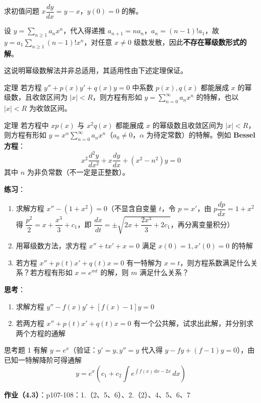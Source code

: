 \begin{example}
求初值问题 $x\dfrac{dy}{dx} = y - x$，$y(0) = 0$ 的解。
\end{example}

\begin{solution}
设 $y = \sum_{n\ge 1} a_n x^n$，代入得递推 $a_{n+1} = na_n$，$a_n = (n-1)!a_1$，故 $y = a_1\sum_{n\ge1}(n-1)!x^n$，对任意 $x \neq 0$ 级数发散，因此\textbf{不存在幂级数形式的解}。
\end{solution}

\begin{remark}
这说明幂级数解法并非总适用，其适用性由下述定理保证。
\end{remark}

\begin{myTheorem}{定理}
若方程 $y'' + p(x)y' + q(x)y = 0$ 中系数 $p(x), q(x)$ 都能展成 $x$ 的幂级数，且收敛区间为 $|x| < R$，则方程有形如 $y = \sum_{n=0}^{\infty} a_n x^n$ 的特解，也以 $|x| < R$ 为收敛区间。
\end{myTheorem}

\begin{myTheorem}{定理}
若方程中 $xp(x)$ 与 $x^2q(x)$ 都能展成 $x$ 的幂级数且收敛区间为 $|x| < R$，则方程有形如 $y = x^\alpha\sum_{n=0}^{\infty} a_n x^n$（$a_0 \neq 0$，$\alpha$ 为待定常数）的特解。例如 \textbf{Bessel 方程}：
$$x^2\frac{d^2y}{dx^2} + x\frac{dy}{dx} + (x^2 - n^2)y = 0$$
其中 $n$ 为非负常数（不一定是正整数）。
\end{myTheorem}

\textbf{练习}：
\begin{enumerate}
    \item 求解方程 $x'' - (1 + x^2) = 0$（不显含自变量 $t$，令 $p = x'$，由 $p\dfrac{dp}{dx} = 1+x^2$ 得 $\dfrac{p^2}{2} = x + \dfrac{x^3}{3} + c_1$，即 $\dfrac{dx}{dt} = \pm\sqrt{2x + \dfrac{2x^3}{3} + 2c_1}$，再分离变量积分）
    \item 用幂级数方法，求方程 $x'' + tx' + x = 0$ 满足 $x(0) = 1, x'(0) = 0$ 的特解
    \item 若方程 $x'' + p(t)x' + q(t)x = 0$ 有一特解为 $x = t$，则方程系数满足什么关系？若方程有形如 $x = e^{mt}$ 的解，则 $m$ 满足什么关系？
\end{enumerate}

\textbf{思考}：
\begin{enumerate}
    \item 求解方程 $y'' - f(x)y' + [f(x) - 1]y = 0$
    \item 若两方程 $x'' + p(t)x' + q(t)x = 0$ 有一个公共解，试求出此解，并分别求两个方程的通解
\end{enumerate}

\begin{remark}
思考题 1 有解 $y = e^x$（验证：$y' = y, y'' = y$ 代入得 $y - fy + (f-1)y = 0$），由已知一特解降阶可得通解
$$y = e^x\left(c_1 + c_2\int e^{\int f(x)\,dx - 2x}\,dx\right)$$
\end{remark}

\textbf{作业（4.3）}：p107-108：1.（2、5、6）、2.（2）、4、5、6、7
